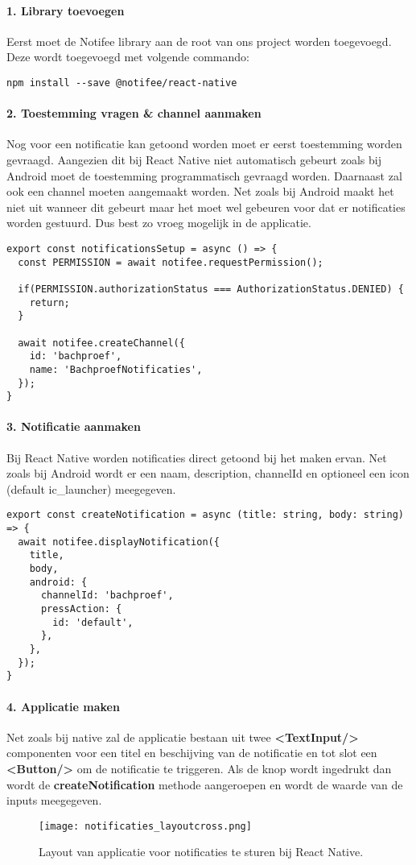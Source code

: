 \paragraph{1. Library toevoegen}
Eerst moet de Notifee library aan de root van ons project worden toegevoegd. 
Deze wordt toegevoegd met volgende commando:
\begin{verbatim}
npm install --save @notifee/react-native
\end{verbatim}

\paragraph{2. Toestemming vragen \& channel aanmaken}
Nog voor een notificatie kan getoond worden moet er eerst toestemming worden gevraagd. 
Aangezien dit bij React Native niet automatisch gebeurt zoals bij Android moet de 
toestemming programmatisch gevraagd worden. Daarnaast zal ook een channel moeten aangemaakt worden.
Net zoals bij Android maakt het niet uit wanneer dit gebeurt maar het moet wel gebeuren 
voor dat er notificaties worden gestuurd. Dus best zo vroeg mogelijk in de applicatie.
\begin{verbatim}
export const notificationsSetup = async () => {
  const PERMISSION = await notifee.requestPermission();

  if(PERMISSION.authorizationStatus === AuthorizationStatus.DENIED) {
    return;
  }

  await notifee.createChannel({
    id: 'bachproef',
    name: 'BachproefNotificaties',
  });
}

\end{verbatim}

\paragraph{3. Notificatie aanmaken}
Bij React Native worden notificaties direct getoond bij het maken ervan. Net zoals bij Android 
wordt er een naam, description, channelId en optioneel een icon (default ic\_launcher) meegegeven. 
\begin{verbatim}
export const createNotification = async (title: string, body: string) => {
  await notifee.displayNotification({
    title,
    body,
    android: {
      channelId: 'bachproef',
      pressAction: {
        id: 'default',
      },
    },
  });
}
\end{verbatim}

\paragraph{4. Applicatie maken}
Net zoals bij native zal de applicatie bestaan 
uit twee \textbf{<TextInput/>} componenten voor een titel en beschijving van de notificatie en tot slot een 
\textbf{<Button/>} om de notificatie te triggeren. Als de knop wordt ingedrukt dan wordt de 
\textbf{createNotification} methode aangeroepen en wordt de waarde van de inputs meegegeven.
\begin{figure}[H]
  \centering
  \texttt{[image: notificaties\_layoutcross.png]}
  \caption{Layout van applicatie voor notificaties te sturen bij React Native.}
\end{figure}